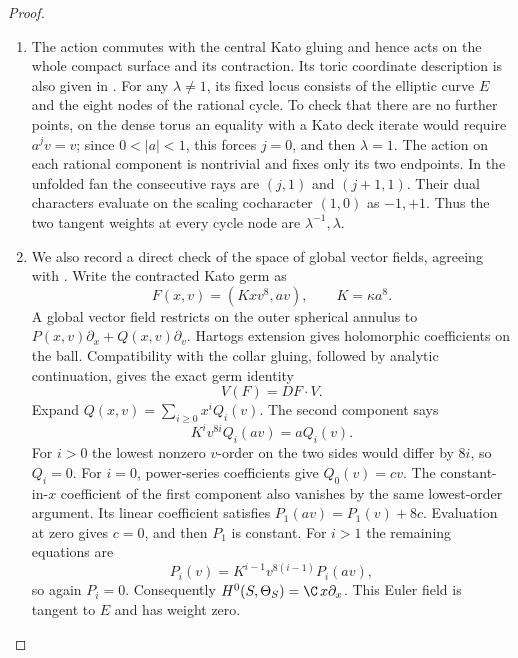 \begin{proof}
\begin{enumerate}[label=\arabic*.,leftmargin=*]
\item The action commutes with the central Kato gluing and hence
acts on the whole compact surface and its contraction.
Its toric coordinate description is also given in
\citet[Section~2, equations~(1)--(8), p.~4]{Fujiki2009D}.
For any $\lambda\ne1$, its fixed locus consists of the elliptic
curve $E$ and the eight nodes of the rational cycle.
To check that there are no further points, on the dense torus
an equality with a Kato deck iterate would require $a^jv=v$;
since $0<|a|<1$, this forces $j=0$, and then $\lambda=1$.
The action on each rational component is nontrivial and fixes
only its two endpoints.  In the unfolded fan the consecutive
rays are $(j,1)$ and $(j+1,1)$.
Their dual characters evaluate on the scaling cocharacter
$(1,0)$ as $-1,+1$.
Thus the two tangent weights at every cycle node are
$\lambda^{-1},\lambda$.

\item We also record a direct check of the space of global vector
fields, agreeing with \citet[Theorem~1.1, pp.~1--2]{Fujiki2009D}.
Write the contracted Kato germ as
\[
 F(x,v)=(Kxv^8,av),\qquad K=\kappa a^8.
\]
A global vector field restricts on the outer spherical annulus
to $P(x,v)\partial_x+Q(x,v)\partial_v$.
Hartogs extension gives holomorphic coefficients on the ball.
Compatibility with the collar gluing, followed by analytic
continuation, gives the exact germ identity
\[
 V(F)=DF\cdot V.
\]
Expand $Q(x,v)=\sum_{i\ge0}x^iQ_i(v)$.
The second component says
\[
 K^iv^{8i}Q_i(av)=aQ_i(v).
\]
For $i>0$ the lowest nonzero $v$-order on the two sides would
differ by $8i$, so $Q_i=0$.
For $i=0$, power-series coefficients give $Q_0(v)=cv$.
The constant-in-$x$ coefficient of the first component also
vanishes by the same lowest-order argument.
Its linear coefficient satisfies
$P_1(av)=P_1(v)+8c$.
Evaluation at zero gives $c=0$, and then $P_1$ is constant.
For $i>1$ the remaining equations are
\[
 P_i(v)=K^{i-1}v^{8(i-1)}P_i(av),
\]
so again $P_i=0$.
Consequently $H^0(S,\Theta_S)=\C\,x\partial_x$.
This Euler field is tangent to $E$ and has weight zero.


\end{enumerate}
\end{proof}
